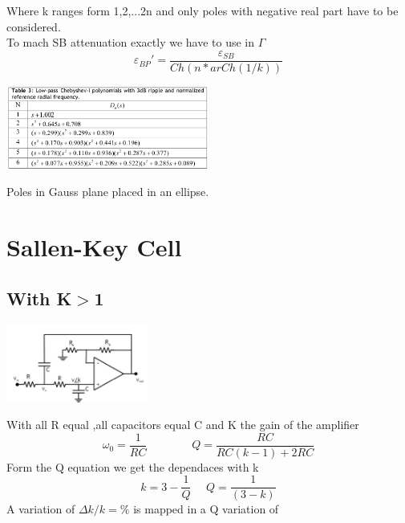 Where k ranges form 1,2,...2n and only poles with negative real part have to be considered.\\

To mach SB attenuation exactly we have to use in $\Gamma$
\begin{equation}
\varepsilon_{BP}'=\frac{\varepsilon_{SB}}{Ch(n*arCh(1/k))}
\end{equation}


\centering
\includegraphics[width=0.5\textwidth]{cheby.png}\\
\raggedright

Poles in Gauss plane placed in an ellipse.\\





\section{Sallen-Key Cell}

\subsection{With K$>$1}
\centering
\includegraphics[width=0.35\textwidth]{skg.png}\\
\raggedright

With all R equal ,all capacitors equal C and K the gain of the amplifier 
\begin{equation}
\omega_0=\frac{1}{RC}\ \ \ \ \ \ \ \ \ \  \ \ \ \ \ \ \ \ Q=\frac{RC}{RC(k-1)+2RC}
\end{equation}
Form the Q equation we get the dependaces with k 
\begin{equation}
k=3-\frac{1}{Q} \ \ \ \ \ \ Q=\frac{1}{(3-k)}
\end{equation}
A variation of $\Delta k/k=\%$ is mapped in a Q variation of 

